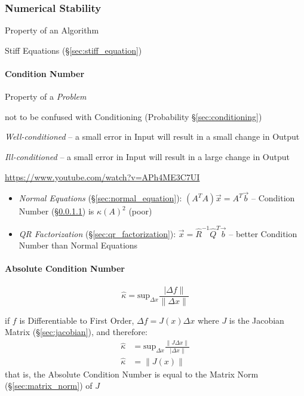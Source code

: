 \subsubsection{Numerical Stability}\label{sec:numerical_stability}

Property of an Algorithm

Stiff Equations (\S\ref{sec:stiff_equation})



\paragraph{Condition Number}\label{sec:condition_number}\hfill

Property of a \emph{Problem}

\fist not to be confused with Conditioning (Probability
\S\ref{sec:conditioning})

\emph{Well-conditioned} -- a small error in Input will result in a small change
in Output

\emph{Ill-conditioned} -- a small error in Input will result in a large change
in Output

\url{https://www.youtube.com/watch?v=APh4ME3C7UI}

\begin{itemize}
  \item \emph{Normal Equations} (\S\ref{sec:normal_equation}): $(A^TA)\vec{x} =
    A^T\vec{b}$ -- Condition Number (\S\ref{sec:condition_number}) is
    $\kappa(A)^2$ (poor)
  \item \emph{QR Factorization} (\S\ref{sec:qr_factorization}): $\vec{x} =
    \hat{R}^{-1}\hat{Q}^T\vec{b}$ -- better Condition Number than Normal
    Equations
\end{itemize}



\paragraph{Absolute Condition Number}\label{sec:absolute_condition_number}
\hfill

\[
  \hat{\kappa} = \mathrm{sup}_{\Delta x} \frac{\ |\Delta f\|}{\|\Delta x\|}
\]

if $f$ is Differentiable to First Order, $\Delta f = J(x) \Delta x$ where $J$
is the Jacobian Matrix (\S\ref{sec:jacobian}), and therefore:
\begin{align*}
  \hat{\kappa} & = \mathrm{sup}_{\Delta x} \frac{\|J\Delta x\|}{\ |\Delta x\|} \\
  \hat{\kappa} & = \|J(x)\|
\end{align*}
that is, the Absolute Condition Number is equal to the Matrix Norm
(\S\ref{sec:matrix_norm}) of $J$



